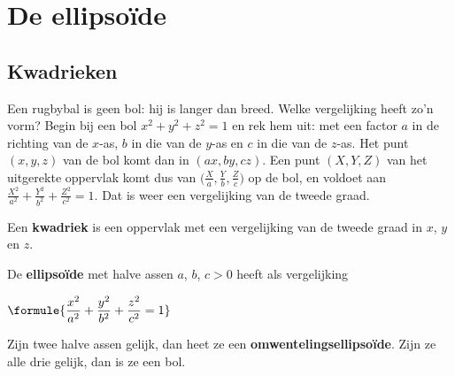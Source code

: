 \begin{oefeningen}[Start]

\end{oefeningen}

\section{De ellipsoïde}

\subsection{Kwadrieken}

Een rugbybal is geen bol: hij is langer dan breed. Welke vergelijking heeft zo'n vorm? Begin bij een bol $x^2 + y^2 + z^2 = 1$ en rek hem uit: met een factor $a$ in de richting van de $x$-as, $b$ in die van de $y$-as en $c$ in die van de $z$-as. Het punt $(x, y, z)$ van de bol komt dan in $(ax, by, cz)$. Een punt $(X, Y, Z)$ van het uitgerekte oppervlak komt dus van $\bigl(\tfrac Xa, \tfrac Yb, \tfrac Zc\bigr)$ op de bol, en voldoet aan $\tfrac{X^2}{a^2} + \tfrac{Y^2}{b^2} + \tfrac{Z^2}{c^2} = 1$. Dat is weer een vergelijking van de tweede graad.

\begin{theorie}
Een \textbf{\textcolor{accent}{kwadriek}} is een oppervlak met een vergelijking van de tweede graad in $x$, $y$ en $z$.

\begin{minipage}[t]{.68\linewidth}
\vspace{0pt}
De \textbf{\textcolor{accent}{ellipsoïde}} met halve assen $a$, $b$, $c > 0$ heeft als vergelijking

\vspace{1mm}
\qquad $\formule{\dfrac{x^2}{a^2} + \dfrac{y^2}{b^2} + \dfrac{z^2}{c^2} = 1}$

\vspace{1mm}
Zijn twee halve assen gelijk, dan heet ze een \textbf{\textcolor{accent}{omwentelingsellipsoïde}}. Zijn ze alle drie gelijk, dan is ze een bol.
\end{minipage}\hfill
\begin{minipage}[t]{.28\linewidth}
\vspace{0pt}
\centering
{}
\end{minipage}
\end{theorie}

